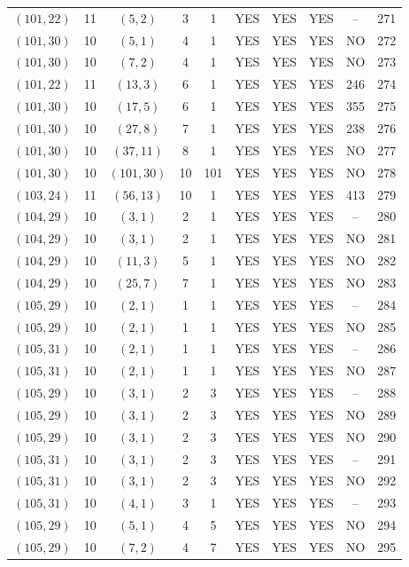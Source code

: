\begin{longtable}{|c|c|c|c|c|c|c|c|c|c|}
$(101, 22)$ & 11 & $(5, 2)$ & 3 & 1 & YES & YES & YES & -- & 271\\
$(101, 30)$ & 10 & $(5, 1)$ & 4 & 1 & YES & YES & YES & NO & 272\\
$(101, 30)$ & 10 & $(7, 2)$ & 4 & 1 & YES & YES & YES & NO & 273\\
$(101, 22)$ & 11 & $(13, 3)$ & 6 & 1 & YES & YES & YES & 246 & 274\\
$(101, 30)$ & 10 & $(17, 5)$ & 6 & 1 & YES & YES & YES & 355 & 275\\
$(101, 30)$ & 10 & $(27, 8)$ & 7 & 1 & YES & YES & YES & 238 & 276\\
$(101, 30)$ & 10 & $(37, 11)$ & 8 & 1 & YES & YES & YES & NO & 277\\
$(101, 30)$ & 10 & $(101, 30)$ & 10 & 101 & YES & YES & YES & NO & 278\\
$(103, 24)$ & 11 & $(56, 13)$ & 10 & 1 & YES & YES & YES & 413 & 279\\
$(104, 29)$ & 10 & $(3, 1)$ & 2 & 1 & YES & YES & YES & -- & 280\\
$(104, 29)$ & 10 & $(3, 1)$ & 2 & 1 & YES & YES & YES & NO & 281\\
$(104, 29)$ & 10 & $(11, 3)$ & 5 & 1 & YES & YES & YES & NO & 282\\
$(104, 29)$ & 10 & $(25, 7)$ & 7 & 1 & YES & YES & YES & NO & 283\\
$(105, 29)$ & 10 & $(2, 1)$ & 1 & 1 & YES & YES & YES & -- & 284\\
$(105, 29)$ & 10 & $(2, 1)$ & 1 & 1 & YES & YES & YES & NO & 285\\
$(105, 31)$ & 10 & $(2, 1)$ & 1 & 1 & YES & YES & YES & -- & 286\\
$(105, 31)$ & 10 & $(2, 1)$ & 1 & 1 & YES & YES & YES & NO & 287\\
$(105, 29)$ & 10 & $(3, 1)$ & 2 & 3 & YES & YES & YES & -- & 288\\
$(105, 29)$ & 10 & $(3, 1)$ & 2 & 3 & YES & YES & YES & NO & 289\\
$(105, 29)$ & 10 & $(3, 1)$ & 2 & 3 & YES & YES & YES & NO & 290\\
$(105, 31)$ & 10 & $(3, 1)$ & 2 & 3 & YES & YES & YES & -- & 291\\
$(105, 31)$ & 10 & $(3, 1)$ & 2 & 3 & YES & YES & YES & NO & 292\\
$(105, 31)$ & 10 & $(4, 1)$ & 3 & 1 & YES & YES & YES & -- & 293\\
$(105, 29)$ & 10 & $(5, 1)$ & 4 & 5 & YES & YES & YES & NO & 294\\
$(105, 29)$ & 10 & $(7, 2)$ & 4 & 7 & YES & YES & YES & NO & 295\\

\end{longtable}
